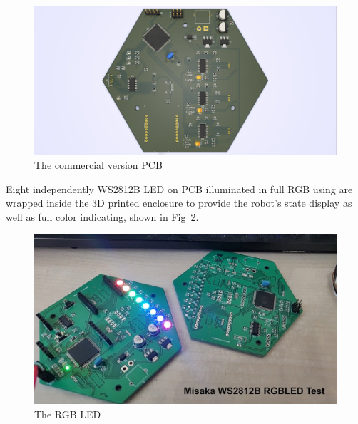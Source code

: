 \documentclass[sigconf]{acmart}
\begin{document}
\begin{figure}[h]
  \centering
  \includegraphics[width=\linewidth]{MainPCB.png}
  \caption{The commercial version PCB}
  \label{fig:MainPCB}
\end{figure}




Eight independently WS2812B LED on PCB illuminated in full RGB using are wrapped inside the 3D printed enclosure to provide the robot’s state display as well as full color indicating, shown in Fig~\ref{fig:RGB}.

\begin{figure}[h]
  \centering
  \includegraphics[width=\linewidth]{RGB.jpg}
  \caption{The RGB LED}
  \label{fig:RGB}
\end{figure}
\end{document}
